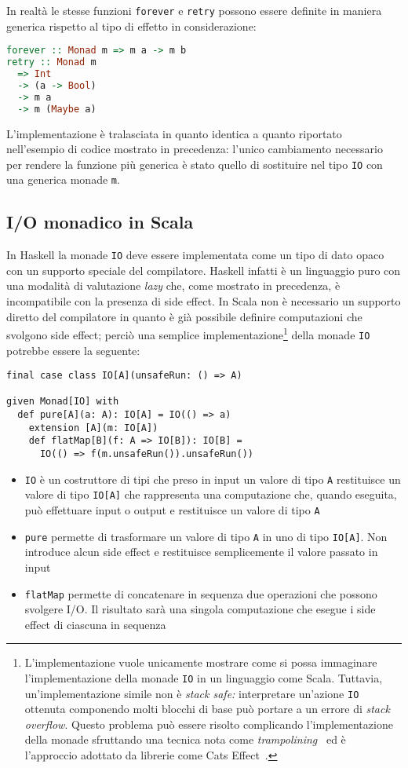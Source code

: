 In realtà le stesse funzioni \lstinline{forever} e \lstinline{retry} possono essere definite in maniera generica rispetto al tipo di effetto in considerazione:
\begin{lstlisting}[language=haskell]
forever :: Monad m => m a -> m b
retry :: Monad m
  => Int
  -> (a -> Bool)
  -> m a
  -> m (Maybe a)
\end{lstlisting}
L'implementazione è tralasciata in quanto identica a quanto riportato nell'esempio di codice mostrato in precedenza: l'unico cambiamento necessario per rendere la funzione più generica è stato quello di sostituire nel tipo \lstinline{IO} con una generica monade \lstinline{m}.

\subsection{I/O monadico in Scala}
In Haskell la monade \lstinline{IO} deve essere implementata come un tipo di dato opaco con un supporto speciale del compilatore. Haskell infatti è un linguaggio puro con una modalità di valutazione \emph{lazy} che, come mostrato in precedenza, è incompatibile con la presenza di side effect.
In Scala non è necessario un supporto diretto del compilatore in quanto è già possibile definire computazioni che svolgono side effect; perciò una semplice implementazione\footnote{L'implementazione vuole unicamente mostrare come si possa immaginare l'implementazione della monade \lstinline{IO} in un linguaggio come Scala. Tuttavia, un'implementazione simile non è \emph{stack safe:} interpretare un'azione \lstinline{IO} ottenuta componendo molti blocchi di base può portare a un errore di \emph{stack overflow}. Questo problema può essere risolto complicando l'implementazione della monade sfruttando una tecnica nota come \emph{trampolining}~\cite{cit:stackless-scala-with-free-monads} ed è l'approccio adottato da librerie come Cats Effect~\cite{cit:cats-effect-stack-safety}.} della monade \lstinline{IO} potrebbe essere la seguente:
\begin{lstlisting}[language=scala3]
final case class IO[A](unsafeRun: () => A)

given Monad[IO] with
  def pure[A](a: A): IO[A] = IO(() => a)
	extension [A](m: IO[A]) 
    def flatMap[B](f: A => IO[B]): IO[B] =
      IO(() => f(m.unsafeRun()).unsafeRun())
\end{lstlisting}
\begin{itemize}
  \item \lstinline{IO} è un costruttore di tipi che preso in input un valore di tipo \lstinline{A} restituisce un valore di tipo \lstinline{IO[A]} che rappresenta una computazione che, quando eseguita, può effettuare input o output e restituisce un valore di tipo \lstinline{A}
  \item \lstinline{pure} permette di trasformare un valore di tipo \lstinline{A} in uno di tipo \lstinline{IO[A]}. Non introduce alcun side effect e restituisce semplicemente il valore passato in input
  \item \lstinline{flatMap} permette di concatenare in sequenza due operazioni che possono svolgere I/O. Il risultato sarà una singola computazione che esegue i side effect di ciascuna in sequenza
\end{itemize}

